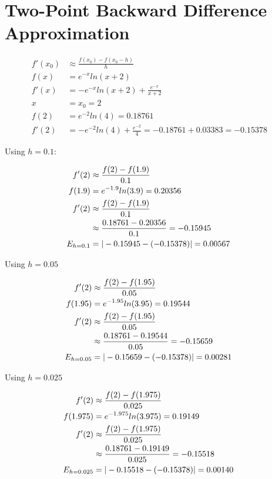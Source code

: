 \section{Two-Point Backward Difference Approximation}
	\begin{align}
		f'(x_{0})&\approx \frac{f(x_{0})-f(x_{0}-h)}{h}& \\
		f(x) &= e^{-x}ln(x+2)& \\
		f'(x) &= -e^{-x}ln(x+2) + \frac{e^{-x}}{x+2}& \\
		x &= x_{0} = 2& \\
		f(2) &= e^{-2}ln(4) = 0.18761& \\
		f'(2) &= -e^{-2}ln(4) + \frac{e^{-2}}{4} = -0.18761 + 0.03383 = -0.15378&
	\end{align}

	Using $h = 0.1$:

	\begin{align}
		f'(2)&\approx \frac{f(2)-f(1.9)}{0.1}& \\
		f(1.9) &= e^{-1.9}ln(3.9) = 0.20356 \\
		f'(2)&\approx \frac{f(2)-f(1.9)}{0.1}& \notag \\
		&\approx \frac{0.18761-0.20356}{0.1} = -0.15945& \\
		E_{h=0.1} &= |-0.15945 - (-0.15378)| = 0.00567&
	\end{align}

	Using $h = 0.05$

	\begin{align}
		f'(2)&\approx \frac{f(2)-f(1.95)}{0.05}& \\
		f(1.95) &= e^{-1.95}ln(3.95) = 0.19544 \\
		f'(2)&\approx \frac{f(2)-f(1.95)}{0.05}& \notag \\
		&\approx \frac{0.18761-0.19544}{0.05} = -0.15659& \\
		E_{h=0.05} &= |-0.15659 - (-0.15378)| = 0.00281&
	\end{align}

	Using $h = 0.025$

	\begin{align}
		f'(2)&\approx \frac{f(2)-f(1.975)}{0.025}& \\
		f(1.975) &= e^{-1.975}ln(3.975) = 0.19149 \\
		f'(2)&\approx \frac{f(2)-f(1.975)}{0.025}& \notag \\
		&\approx \frac{0.18761-0.19149}{0.025} = -0.15518& \\
		E_{h=0.025} &= |-0.15518 - (-0.15378)| = 0.00140&
	\end{align}
